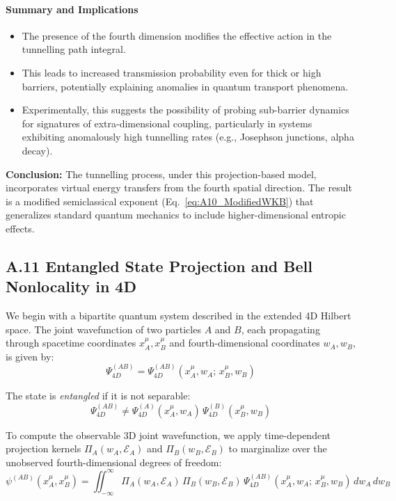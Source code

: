 \documentclass[12pt]{article}
\begin{document}
\paragraph{Summary and Implications}

\begin{itemize}
  \item The presence of the fourth dimension modifies the effective action in the tunnelling path integral.
  \item This leads to increased transmission probability even for thick or high barriers, potentially explaining anomalies in quantum transport phenomena.
  \item Experimentally, this suggests the possibility of probing sub-barrier dynamics for signatures of extra-dimensional coupling, particularly in systems exhibiting anomalously high tunnelling rates (e.g., Josephson junctions, alpha decay).
\end{itemize}

\textbf{Conclusion:}  
The tunnelling process, under this projection-based model, incorporates virtual energy transfers from the fourth spatial direction. The result is a modified semiclassical exponent (Eq.~\eqref{eq:A10_ModifiedWKB}) that generalizes standard quantum mechanics to include higher-dimensional entropic effects.
\subsection*{A.11 \quad Entangled State Projection and Bell Nonlocality in 4D}
\label{eq:A11}

We begin with a bipartite quantum system described in the extended 4D Hilbert space. The joint wavefunction of two particles \(A\) and \(B\), each propagating through spacetime coordinates \(x^\mu_A, x^\mu_B\) and fourth-dimensional coordinates \(w_A, w_B\), is given by:
\begin{equation}
\Psi_{4D}^{(AB)} = \Psi_{4D}^{(AB)}(x^\mu_A, w_A;\, x^\mu_B, w_B)
\label{eq:A11_1}
\end{equation}

The state is \emph{entangled} if it is not separable:
\begin{equation}
\Psi_{4D}^{(AB)} \neq \Psi_{4D}^{(A)}(x^\mu_A, w_A)\, \Psi_{4D}^{(B)}(x^\mu_B, w_B)
\label{eq:A11_2}
\end{equation}

To compute the observable 3D joint wavefunction, we apply time-dependent projection kernels \(\Pi_A(w_A, \mathcal{E}_A)\) and \(\Pi_B(w_B, \mathcal{E}_B)\) to marginalize over the unobserved fourth-dimensional degrees of freedom:
\begin{equation}
\psi^{(AB)}(x^\mu_A, x^\mu_B) = \iint_{-\infty}^{\infty} \Pi_A(w_A, \mathcal{E}_A)\, \Pi_B(w_B, \mathcal{E}_B)\, \Psi_{4D}^{(AB)}(x^\mu_A, w_A;\, x^\mu_B, w_B)\, dw_A\, dw_B
\label{eq:A11_3}
\end{equation}
\end{document}
